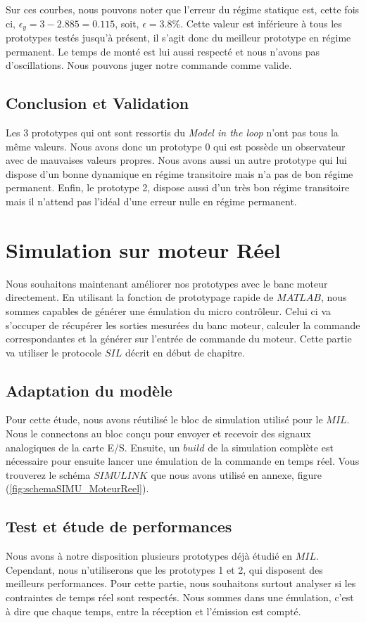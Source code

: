 		Sur ces courbes, nous pouvons noter que l'erreur du régime statique est, cette fois ci, $\epsilon_y = 3 - 2.885 = 0.115$, soit, $\epsilon = 3.8\%$. Cette valeur est inférieure à tous les prototypes testés jusqu'à présent, il s'agit donc du meilleur prototype en régime permanent. Le temps de monté est lui aussi respecté et nous n'avons pas d'oscillations. Nous pouvons juger notre commande comme valide.
		\subsection{Conclusion et Validation}
	Les 3 prototypes qui ont sont ressortis du \emph{Model in the loop} n'ont pas tous la même valeurs. Nous avons donc un prototype 0 qui est possède un observateur avec de mauvaises valeurs propres. Nous avons aussi un autre prototype qui lui dispose d'un bonne dynamique en régime transitoire mais n'a pas de bon régime permanent. Enfin, le prototype 2, dispose aussi d'un très bon régime transitoire mais il n'attend pas l'idéal d'une erreur nulle en régime permanent. 
	
	
	
	
\section{Simulation sur moteur Réel}
		Nous souhaitons maintenant améliorer nos prototypes avec le banc moteur directement. En utilisant la fonction de prototypage rapide de $MATLAB$, nous sommes capables de générer une émulation du micro contrôleur. Celui ci va s'occuper de récupérer les sorties mesurées du banc moteur, calculer la commande correspondantes et la générer sur l'entrée de commande du moteur. Cette partie va utiliser le protocole $SIL$ décrit en début de chapitre.
		\subsection{Adaptation du modèle}
Pour cette étude, nous avons réutilisé le bloc de simulation utilisé pour le $MIL$. Nous le connectons au bloc conçu pour envoyer et recevoir des signaux analogiques de la carte E/S. Ensuite, un $build$ de la simulation complète est nécessaire pour ensuite lancer une émulation de la commande en temps réel. Vous trouverez le schéma $SIMULINK$ que nous avons utilisé en annexe, figure (\ref{fig:schemaSIMU_MoteurReel}).
		\subsection{Test et étude de performances}
		Nous avons à notre disposition plusieurs prototypes déjà étudié en $MIL$. Cependant, nous n'utiliserons que les prototypes 1 et 2, qui disposent des meilleurs performances. Pour cette partie, nous souhaitons surtout analyser si les contraintes de temps réel sont respectés. Nous sommes dans une émulation, c'est à dire que chaque temps, entre la réception et l'émission est compté.
		
